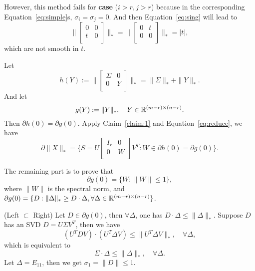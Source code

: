 However,
this method fails for \textbf{case} ($i>r, j>r$)
because in the corresponding Equation~\eqref{eq:simple}s,
$\sigma_i=\sigma_j=0$.
And then Equation~\eqref{eq:sing} will lead to
\begin{equation}
    \bigg\|\begin{bmatrix}
        0 & 0 \\
        t & 0 \\
    \end{bmatrix}\bigg\|_*=
    \bigg\|\begin{bmatrix}
        0 & t \\
        0 & 0 \\
    \end{bmatrix}\bigg\|_*=|t|,
\end{equation}
which are not smooth in $t$.

Let
\begin{equation}
    h(Y):=\bigg\|\begin{bmatrix}
            \Sigma & 0 \\
            0      & Y \\
        \end{bmatrix}\bigg\|_*
        =\|\Sigma\|_*+\|Y\|_*.
\end{equation}
And let
\begin{equation}
    g(Y):=\|Y\|_*,\quad Y\in{\mathbb{R}}^{(m-r)\times(n-r)}.
\end{equation}
Then $\partial h(0)=\partial g(0)$.
Apply Claim~\ref{claim:1} and Equation~\eqref{eq:reduce},
we have
\begin{equation}
    \partial \|X\|_*=\bigg\{
        S=U\begin{bmatrix}
            I_r & 0 \\
            0   & W \\
        \end{bmatrix}V^T:W\in\partial h(0)=\partial g(0)
        \bigg\}.
\end{equation}

The remaining part is to prove that
\begin{equation}
    \partial g(0)=\{W:\|W\|\le1\},
\end{equation}
where $\|W\|$ is the spectral norm, and
$\partial g(0)=\{D:\|\Delta\|_*\ge D\cdot\Delta,
\forall\Delta\in{\mathbb{R}}^{(m-r)\times(n-r)}\}$.

(Left $\subset$ Right)
Let $D\in\partial g(0)$,
then $\forall\Delta$,
one has $D\cdot\Delta\le\|\Delta\|_*$.
Suppose $D$ has an SVD $D=U\Sigma V^T$,
then we have
\begin{equation}
    (U^TDV)\cdot(U^T\Delta V)\le\|U^T\Delta V\|_*,
    \quad\forall\Delta,
\end{equation}
which is equivalent to
\begin{equation}
    \Sigma\cdot\Delta\le\|\Delta\|_*,
    \quad\forall\Delta.
\end{equation}
Let $\Delta=E_{11}$,
then we get $\sigma_1=\|D\|\le1$.

